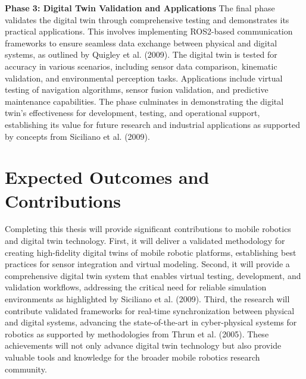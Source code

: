 \textbf{Phase 3: Digital Twin Validation and Applications}
The final phase validates the digital twin through comprehensive testing and
demonstrates its practical applications. This involves implementing ROS2-based
communication frameworks to ensure seamless data exchange between physical and
digital systems, as outlined by Quigley et al. (2009). The digital twin is tested
for accuracy in various scenarios, including sensor data comparison, kinematic
validation, and environmental perception tasks. Applications include virtual
testing of navigation algorithms, sensor fusion validation, and predictive
maintenance capabilities. The phase culminates in demonstrating the digital twin's
effectiveness for development, testing, and operational support, establishing its
value for future research and industrial applications as supported by concepts
from Siciliano et al. (2009).

\section{Expected Outcomes and Contributions}

Completing this thesis will provide significant contributions to mobile robotics
and digital twin technology. First, it will deliver a validated methodology for
creating high-fidelity digital twins of mobile robotic platforms, establishing
best practices for sensor integration and virtual modeling. Second, it will
provide a comprehensive digital twin system that enables virtual testing,
development, and validation workflows, addressing the critical need for reliable
simulation environments as highlighted by Siciliano et al. (2009). Third, the
research will contribute validated frameworks for real-time synchronization
between physical and digital systems, advancing the state-of-the-art in
cyber-physical systems for robotics as supported by methodologies from
Thrun et al. (2005). These achievements will not only advance digital twin
technology but also provide valuable tools and knowledge for the broader
mobile robotics research community.
